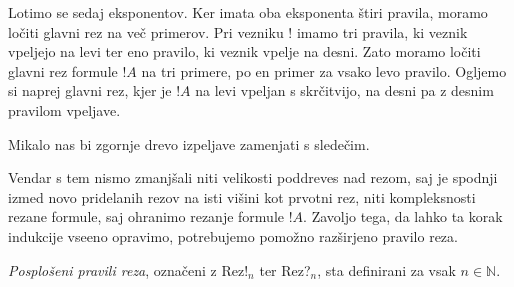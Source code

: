 Lotimo se sedaj eksponentov. Ker imata oba eksponenta štiri pravila, moramo ločiti glavni rez na več primerov. Pri vezniku ! imamo tri pravila, ki veznik vpeljejo na levi ter eno pravilo, ki veznik vpelje na desni. Zato moramo ločiti glavni rez formule $!A$ na tri primere, po en primer za vsako levo pravilo. Ogljemo si naprej glavni rez, kjer je $!A$ na levi vpeljan s skrčitvijo, na desni pa z desnim pravilom vpeljave.
\begin{prooftree}


\end{prooftree}
Mikalo nas bi zgornje drevo izpeljave zamenjati s sledečim.
\begin{prooftree}




\end{prooftree}
Vendar s tem nismo zmanjšali niti velikosti poddreves nad rezom, saj je spodnji izmed novo pridelanih rezov na isti višini kot prvotni rez, niti kompleksnosti rezane formule, saj ohranimo rezanje formule $!A$. Zavoljo tega, da lahko ta korak indukcije vseeno opravimo, potrebujemo pomožno razširjeno pravilo reza.
\begin{definicija}
    \emph{Posplošeni pravili reza}, označeni z Rez!$_n$ ter Rez?$_{n}$, sta definirani za vsak $n \in \mathbb{N}$.
    \begin{prooftree}
    \end{prooftree}
    \begin{prooftree}
    \end{prooftree}
\end{definicija}

